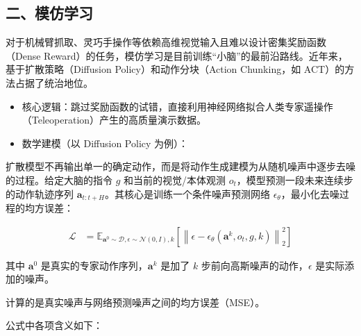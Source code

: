 \hypertarget{ux4e8cux6a21ux4effux5b66ux4e60}{%
\subsection{二、模仿学习}\label{ux4e8cux6a21ux4effux5b66ux4e60}}

对于机械臂抓取、灵巧手操作等依赖高维视觉输入且难以设计密集奖励函数（Dense Reward）的任务，模仿学习是目前训练``小脑''的最前沿路线。近年来，基于扩散策略（Diffusion Policy）和动作分块（Action Chunking，如 ACT）的方法占据了统治地位。

\begin{itemize}
\tightlist
\item
  核心逻辑：跳过奖励函数的试错，直接利用神经网络拟合人类专家遥操作（Teleoperation）产生的高质量演示数据。
\item
{}
  数学建模（以 Diffusion Policy 为例）：
\end{itemize}

扩散模型不再输出单一的确定动作，而是将动作生成建模为从随机噪声中逐步去噪的过程。给定大脑的指令 \(g\) 和当前的视觉/本体观测 \(o_t\)，模型预测一段未来连续步的动作轨迹序列 \(\mathbf{a}_{t:t+H}\)。其核心是训练一个条件噪声预测网络 \(\epsilon_\theta\)，最小化去噪过程的均方误差：

\[
\begin{aligned}
\mathcal{L}
&=
\mathbb{E}_{\mathbf{a}^0\sim\mathcal{D},\epsilon\sim\mathcal{N}(0,I),k}
\left[
\left\|
\epsilon-\epsilon_\theta(\mathbf{a}^k,o_t,g,k)
\right\|_2^2
\right]
\end{aligned}
\]

其中 \(\mathbf{a}^0\) 是真实的专家动作序列，\(\mathbf{a}^k\) 是加了 \(k\) 步前向高斯噪声的动作，\(\epsilon\) 是实际添加的噪声。

计算的是真实噪声与网络预测噪声之间的均方误差（MSE）。

公式中各项含义如下：

